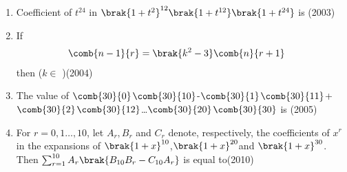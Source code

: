 \begin{enumerate}[label=\thesubsection.\arabic*,ref=\thesubsection.\theenumi]
\begin{enumerate}
\end{enumerate}
\item Coefficient of $t^{24}$ in $\brak{{1+t^2}}^{12}\brak{1+t^{12}}\brak{1+t^{24}}$ is \hfill(2003)
\begin{enumerate}
\end{enumerate}
\item If 
\begin{align}
\comb{n-1}{r} &= \brak{k^2-3} \comb{n}{r+1} \notag
\end{align}
then ($k \in $ )\hfill(2004)
\begin{enumerate}
\begin{multicols}{4}
    \item $(-8,-2]$
    \item $[2,\infty)$
    \item$\sbrak{-\sqrt{3},\sqrt{3}}$
    \item$(\sqrt{3},2]$
    \end{multicols}
\end{enumerate}

\item The value of
	$\comb{30}{0}$$\comb{30}{10}$-$\comb{30}{1}$$\comb{30}{11}$+$\comb{30}{2}$$\comb{30}{12}$\dots$\comb{30}{20}$$\comb{30}{30}$ is \hfill(2005)
\begin{enumerate}
\end{enumerate}
\item For $r=0,1\dots,10$, let $A_r,B_r$ and $C_r$ denote, respectively, the coefficients of $x^r$ in the expansions of $\brak{1+x}^{10}$,$\brak{1+x}^{20}$and $\brak{1+x}^{30}$. Then $\sum_{r=1}^{10}A_r\brak{B_{10}B_r-C_{10}A_r}$ is equal to\hfill(2010)
\begin{enumerate}
\end{enumerate}


\end{enumerate}
